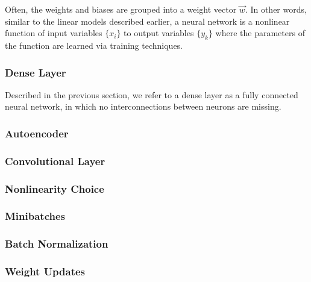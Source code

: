 Often, the weights and biases are grouped into a weight vector $\vec{w}$. In other words, similar to the linear models described earlier, a neural network is a nonlinear function of input variables $\{x_i\}$ to output variables $\{y_k\}$ where the parameters of the function are learned via training techniques.

\subsubsection{Dense Layer}

Described in the previous section, we refer to a dense layer as a fully connected neural network, in which no interconnections between neurons are missing.

\subsubsection{Autoencoder}



\subsubsection{Convolutional Layer}



\subsubsection{Nonlinearity Choice}



\subsubsection{Minibatches}



\subsubsection{Batch Normalization}



\subsubsection{Weight Updates}



